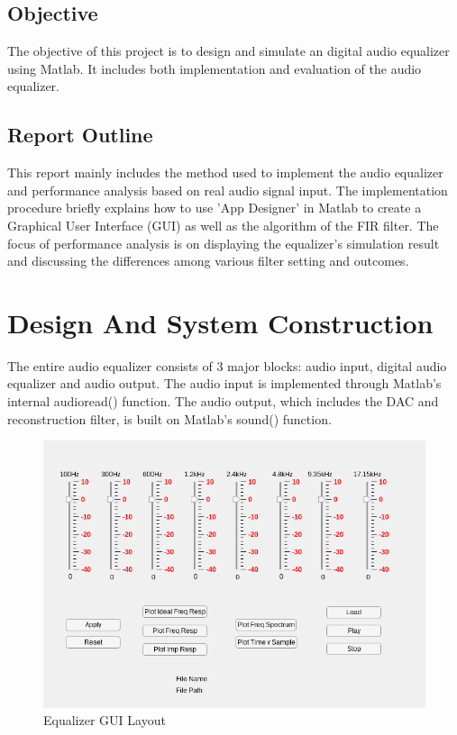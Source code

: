 \documentclass[titlepage]{article}
\begin{document}
\subsection{Objective}
\label{sec:orga80a719}
The objective of this project is to design and simulate an digital audio
equalizer using Matlab. It includes both implementation and evaluation of
the audio equalizer. 
\subsection{Report Outline}
\label{sec:org009a8ad}
This report mainly includes the method used to implement the audio equalizer
and performance analysis based on real audio signal input. The implementation
procedure briefly explains how to use 'App Designer' in Matlab to create a
Graphical User Interface (GUI) as well as the algorithm of the FIR filter.
The focus of performance analysis is on displaying the equalizer's simulation
result and discussing the differences among various filter setting and
outcomes.
\section{Design And System Construction}
\label{sec:orgb3428cb}
The entire audio equalizer consists of 3 major blocks: audio input, digital
audio equalizer and audio output. The audio input is implemented through
Matlab's internal audioread() function. The audio output, which includes the
DAC and reconstruction filter, is built on Matlab's sound() function.

\begin{figure}[htbp]
\centering
\includegraphics[width=.9\linewidth]{layout.png}
\caption{Equalizer GUI Layout}
\end{figure}
\end{document}
